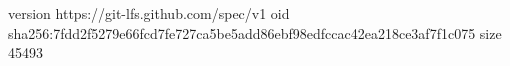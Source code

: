 version https://git-lfs.github.com/spec/v1
oid sha256:7fdd2f5279e66fcd7fe727ca5be5add86ebf98edfccac42ea218ce3af7f1c075
size 45493
